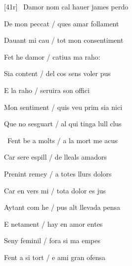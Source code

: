 \documentclass[12pt]{article}
\begin{document}
\begin{estrofa}

 [41r] \textparagraph\  Damor nom cal hauer james perdo

 De mon peccat / ques amar follament

 Dauant mi cau / tot mon consentiment

 Fet he damor / catiua ma raho:

 Sia content / del cos sens voler pus

 E la  raho / seruira son offici

 Mon sentiment / quis veu prim sia nici

 Que no sesguart / al qui tinga lull clus

\end{estrofa}



\begin{estrofa}

 \textparagraph\  Fent be a molts / a la mort me acus

 Car sere espill / de lleals amadors

 Prenint remey / a totes llurs dolors

 Car en vers mi / tota dolor es jus

 Aytant com he / pus alt llevada pensa

 E netament / hay en amor entes

 Seny feminil / fora si ma empes

 Fent a si tort / e ami gran ofensa

\end{estrofa}





\begin{estrofaBuida}


\end{estrofaBuida}
\end{document}
